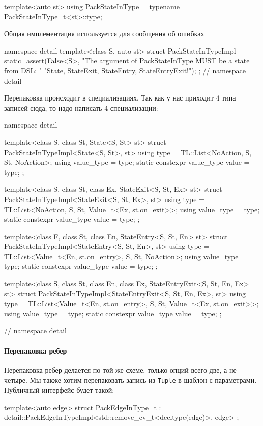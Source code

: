\documentclass{article}
\begin{document}
{\begin{cppcode}
template<auto st>
using PackStateInType = typename PackStateInType_t<st>::type;
\end{cppcode}
Общая имплементация используется для сообщения об ошибках
\begin{cppcode}
namespace detail {
template<class S, auto st>
struct PackStateInTypeImpl {
  static_assert(False<S>, "The argument of PackStateInType MUST be a state from DSL: "
                "State, StateExit, StateEntry, StateEntryExit!");
};
} // namespace detail
\end{cppcode}
Перепаковка происходит в специализациях.
Так как у нас приходит $4$ типа записей сюда, то надо написать $4$ специализации:
\begin{cppcode}
namespace detail {
template<class S, class St, State<S, St> st>
struct PackStateInTypeImpl<State<S, St>, st> {
  using type = TL::List<NoAction, S, St, NoAction>;
  using value_type = type;
  static constexpr value_type value = type{};
};

template<class S, class St, class Ex, StateExit<S, St, Ex> st>
struct PackStateInTypeImpl<StateExit<S, St, Ex>, st> {
  using type = TL::List<NoAction, S, St, Value_t<Ex, st.on_exit>>;
  using value_type = type;
  static constexpr value_type value = type{};
};

template<class F, class St, class En, StateEntry<S, St, En> st>
struct PackStateInTypeImpl<StateEntry<S, St, En>, st> {
  using type = TL::List<Value_t<En, st.on_entry>, S, St, NoAction>;
  using value_type = type;
  static constexpr value_type value = type{};
};

template<class S, class St, class En, class Ex, StateEntryExit<S, St, En, Ex> st>
struct PackStateInTypeImpl<StateEntryExit<S, St, En, Ex>, st> {
  using type = TL::List<Value_t<En, st.on_entry>, S, St, Value_t<Ex, st.on_exit>>;
  using value_type = type;
  static constexpr value_type value = type{};
};
} // namespace detail
\end{cppcode}

\paragraph{Перепаковка ребер}

Перепаковка ребер делается по той же схеме, только опций всего две, а не четыре.
Мы также хотим перепаковать запись из \verb"Tuple" в шаблон с параметрами.
Публичный интерфейс будет такой:
\begin{cppcode}
template<auto edge>
struct PackEdgeInType_t
    : detail::PackEdgeInTypeImpl<std::remove_cv_t<decltype(edge)>, edge> {};


\end{cppcode}}
\end{document}
